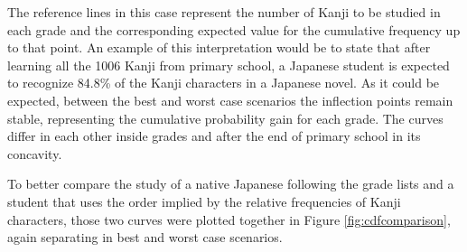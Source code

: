 The reference lines in this case represent the number of Kanji to be studied in each grade and the corresponding expected value for the cumulative frequency up to that point. An example of this interpretation would be to state that after learning all the 1006 Kanji from primary school, a Japanese student is expected to recognize 84.8\% of the Kanji characters in a Japanese novel. As it could be expected, between the best and worst case scenarios the inflection points remain stable, representing the cumulative probability gain for each grade. The curves differ in each other inside grades and after the end of primary school in its concavity.

To better compare the study of a native Japanese following the grade lists and a student that uses the order implied by the relative frequencies of Kanji characters, those two curves were plotted together in Figure \ref{fig:cdfcomparison}, again separating in best and worst case scenarios.

